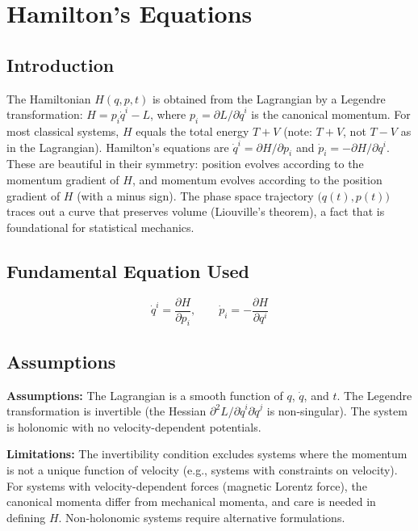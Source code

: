 \documentclass[11pt,openright]{book}
\begin{document}

\chapter{Hamilton's Equations}

\section*{Introduction}

The Hamiltonian $H(q,p,t)$ is obtained from the Lagrangian by a Legendre transformation: $H = p_i\dot{q}^i - L$, where $p_i = \partial L/\partial\dot{q}^i$ is the canonical momentum. For most classical systems, $H$ equals the total energy $T + V$ (note: $T + V$, not $T - V$ as in the Lagrangian). Hamilton's equations are $\dot{q}^i = \partial H/\partial p_i$ and $\dot{p}_i = -\partial H/\partial q^i$. These are beautiful in their symmetry: position evolves according to the momentum gradient of $H$, and momentum evolves according to the position gradient of $H$ (with a minus sign). The phase space trajectory $\bigl(q(t), p(t)\bigr)$ traces out a curve that preserves volume (Liouville's theorem), a fact that is foundational for statistical mechanics.
\section*{Fundamental Equation Used}

\[
\dot{q}^i = \frac{\partial H}{\partial p_i},\qquad \dot{p}_i = -\frac{\partial H}{\partial q^i}
\]
\section*{Assumptions}

\textbf{Assumptions:} The Lagrangian is a smooth function of $q$, $\dot{q}$, and $t$. The Legendre transformation is invertible (the Hessian $\partial^2 L/\partial\dot{q}^i\partial\dot{q}^j$ is non-singular). The system is holonomic with no velocity-dependent potentials.


\textbf{Limitations:} The invertibility condition excludes systems where the momentum is not a unique function of velocity (e.g., systems with constraints on velocity). For systems with velocity-dependent forces (magnetic Lorentz force), the canonical momenta differ from mechanical momenta, and care is needed in defining $H$. Non-holonomic systems require alternative formulations.
\end{document}
